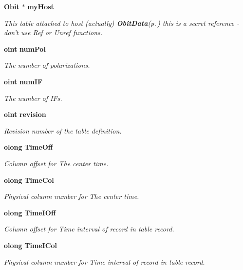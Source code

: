 \begin{CompactItemize}
{\bf Obit} $\ast$ {\bf my\-Host}
\begin{CompactList}\small\item\em This table attached to host (actually) {\bf Obit\-Data}{\rm (p.\,\pageref{structObitData})} this is a secret reference - don't use Ref or Unref functions. \item\end{CompactList}\item 
{\bf oint} {\bf num\-Pol}
\begin{CompactList}\small\item\em The number of polarizations. \item\end{CompactList}\item 
{\bf oint} {\bf num\-IF}
\begin{CompactList}\small\item\em The number of IFs. \item\end{CompactList}\item 
{\bf oint} {\bf revision}
\begin{CompactList}\small\item\em Revision number of the table definition. \item\end{CompactList}\item 
{\bf olong} {\bf Time\-Off}
\begin{CompactList}\small\item\em Column offset for The center time. \item\end{CompactList}\item 
{\bf olong} {\bf Time\-Col}
\begin{CompactList}\small\item\em Physical column number for The center time. \item\end{CompactList}\item 
{\bf olong} {\bf Time\-IOff}
\begin{CompactList}\small\item\em Column offset for Time interval of record in table record. \item\end{CompactList}\item 
{\bf olong} {\bf Time\-ICol}
\begin{CompactList}\small\item\em Physical column number for Time interval of record in table record. \item\end{CompactList}\item 

\end{CompactItemize}
